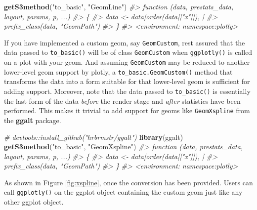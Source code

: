 \documentclass[12pt,]{isuthesis}
\newenvironment{Shaded}{\begin{snugshade}}{\end{snugshade}}
\newcommand{\KeywordTok}[1]{\textcolor[rgb]{0.13,0.29,0.53}{\textbf{{#1}}}}
\newcommand{\StringTok}[1]{\textcolor[rgb]{0.31,0.60,0.02}{{#1}}}
\newcommand{\CommentTok}[1]{\textcolor[rgb]{0.56,0.35,0.01}{\textit{{#1}}}}
\newcommand{\NormalTok}[1]{{#1}}
\begin{document}
\begin{Shaded}
\begin{Highlighting}[]
\KeywordTok{getS3method}\NormalTok{(}\StringTok{"to_basic"}\NormalTok{, }\StringTok{"GeomLine"}\NormalTok{)}
\CommentTok{#> function (data, prestats_data, layout, params, p, ...) }
\CommentTok{#> \{}
\CommentTok{#>     data <- data[order(data[["x"]]), ]}
\CommentTok{#>     prefix_class(data, "GeomPath")}
\CommentTok{#> \}}
\CommentTok{#> <environment: namespace:plotly>}
\end{Highlighting}
\end{Shaded}

If you have implemented a custom geom, say \texttt{GeomCustom}, rest
assured that the data passed to \texttt{to\_basic()} will be of class
\texttt{GeomCustom} when \texttt{ggplotly()} is called on a plot with
your geom. And assuming \texttt{GeomCustom} may be reduced to another
lower-level geom support by plotly, a \texttt{to\_basic.GeomCustom()}
method that transforms the data into a form suitable for that
lower-level geom is sufficient for adding support. Moreover, note that
the data passed to \texttt{to\_basic()} is essentially the last form of
the data \emph{before} the render stage and \emph{after} statistics have
been performed. This makes it trivial to add support for geoms like
\texttt{GeomXspline} from the \textbf{ggalt} package.

\begin{Shaded}
\begin{Highlighting}[]
\CommentTok{# devtools::install_github("hrbrmstr/ggalt")}
\KeywordTok{library}\NormalTok{(ggalt)}
\KeywordTok{getS3method}\NormalTok{(}\StringTok{"to_basic"}\NormalTok{, }\StringTok{"GeomXspline"}\NormalTok{)}
\CommentTok{#> function (data, prestats_data, layout, params, p, ...) }
\CommentTok{#> \{}
\CommentTok{#>     data <- data[order(data[["x"]]), ]}
\CommentTok{#>     prefix_class(data, "GeomPath")}
\CommentTok{#> \}}
\CommentTok{#> <environment: namespace:plotly>}
\end{Highlighting}
\end{Shaded}

As shown in Figure \ref{fig:xspline}, once the conversion has been
provided. Users can call \texttt{ggplotly()} on the ggplot object
containing the custom geom just like any other ggplot object.
\end{document}
